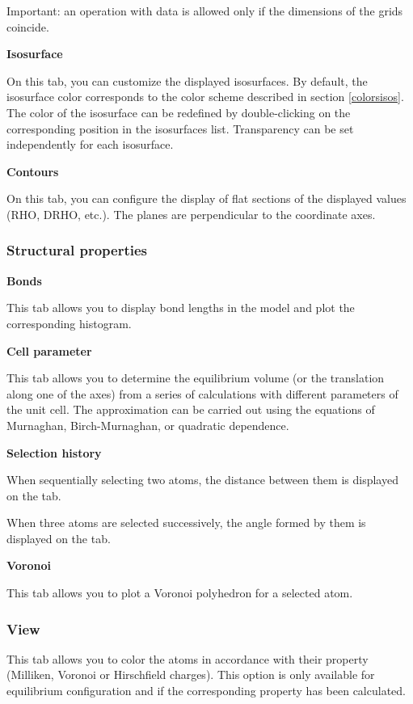 \documentclass{article}
\begin{document}
Important: an operation with data is allowed only if the dimensions of the grids coincide.


\textbf{Isosurface}

On this tab, you can customize the displayed isosurfaces. By default, the isosurface color corresponds to the color scheme described in section \ref{colorsisos}. The color of the isosurface can be redefined by double-clicking on the corresponding position in the isosurfaces list. Transparency can be set independently for each isosurface.

\textbf{Contours}

On this tab, you can configure the display of flat sections of the displayed values (RHO, DRHO, etc.). The planes are perpendicular to the coordinate axes.


\subsubsection{Structural properties}

\textbf{Bonds}

This tab allows you to display bond lengths in the model and plot the corresponding histogram.

\textbf{Cell parameter}

This tab allows you to determine the equilibrium volume (or the translation along one of the axes) from a series of calculations with different parameters of the unit cell. The approximation can be carried out using the equations of Murnaghan, Birch-Murnaghan, or quadratic dependence.

\textbf{Selection history}

When sequentially selecting two atoms, the distance between them is displayed on the tab.

When three atoms are selected successively, the angle formed by them is displayed on the tab.

\textbf{Voronoi}

This tab allows you to plot a Voronoi polyhedron for a selected atom.

\subsubsection{View}

This tab allows you to color the atoms in accordance with their property (Milliken, Voronoi or Hirschfield charges). This option is only available for equilibrium configuration and if the corresponding property has been calculated.
\end{document}
